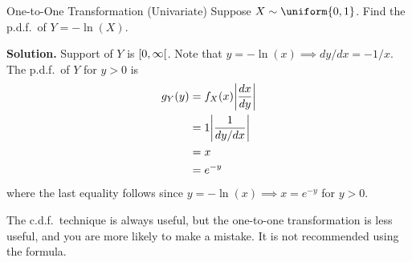 \begin{Example}{One-to-One Transformation (Univariate)}{}
    Suppose $ X \sim \uniform{0,1} $. Find the p.d.f.\ of $ Y=-\ln(X) $.

    \textbf{Solution.} Support of $ Y $ is $ \interval[open right]{0}{\infty} $.
    Note that $ y=-\ln(x)\implies dy/dx=-1/x $.
    The p.d.f.\ of $ Y $ for $ y>0 $ is
    \begin{align*}
        g_Y(y)
         & =f_X(x)\abs*{\frac{dx}{dy}} \\
         & =1\abs*{\frac{1}{dy/dx}}    \\
         & =x                          \\
         & =e^{-y}
    \end{align*}
    where the last equality follows since
    $ y=-\ln(x)\implies x=e^{-y} $ for $ y>0 $.
\end{Example}
\begin{Remark}{}{}
    The c.d.f.\ technique is always useful, but the
    one-to-one transformation is less useful,
    and you are more likely to make a mistake.
    It is not recommended using the formula.
\end{Remark}
